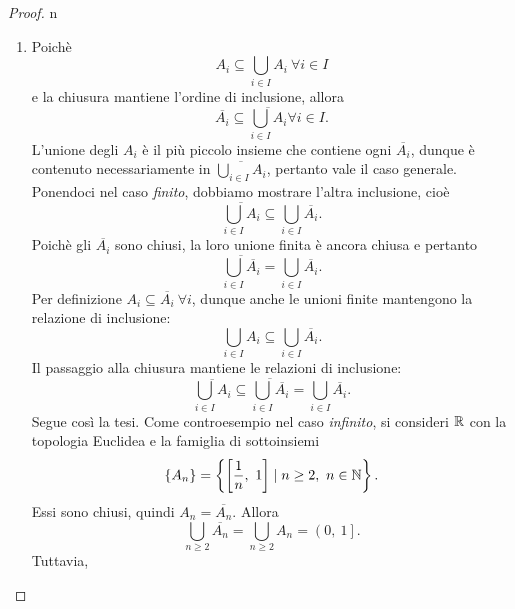 \begin{proof}{n}~{}
	\begin{enumerate}[label=\Roman*]
	\item Poichè
	\begin{equation*}
		A_i\subseteq \bigcup_{i\in I}A_i\ \forall i\in I
	\end{equation*}
	e la chiusura mantiene l'ordine di inclusione, allora
	\begin{equation*}
		\overline{A_i}\subseteq \overline{\bigcup_{i\in I}A_i}\forall i\in I.
	\end{equation*}
	L'unione degli $A_i$ è il più piccolo insieme che contiene ogni $\overline{A_i}$, dunque è contenuto necessariamente in $\displaystyle \overline{\bigcup_{i\in I}A_i}$, pertanto vale il caso generale. Ponendoci nel caso \textit{finito}, dobbiamo mostrare l'altra inclusione, cioè
	\begin{equation*}
		\overline{\bigcup_{i\in I}A_i}\subseteq\bigcup_{i\in I}\overline{A_i}.
	\end{equation*}
	Poichè gli $\overline{A_i}$ sono chiusi, la loro unione finita è ancora chiusa e pertanto
	\begin{equation*}
		\overline{\bigcup_{i\in I}\overline{A_i}}=\bigcup_{i\in I}\overline{A_i}.
	\end{equation*}
	Per definizione $A_i\subseteq\overline{A_i}\ \forall i$, dunque anche le unioni finite mantengono la relazione di inclusione:
	\begin{equation*}
		\bigcup_{i\in I}A_i\subseteq\bigcup_{i\in I}\overline{A_i}.
	\end{equation*}
	Il passaggio alla chiusura mantiene le relazioni di inclusione:
	\begin{equation*}
			\overline{\bigcup_{i\in I}A_i}\subseteq\overline{\bigcup_{i\in I}\overline{A_i}}=\bigcup_{i\in I}\overline{A_i}.
	\end{equation*}
	Segue così la tesi.	Come controesempio nel caso \textit{infinito}, si consideri $\mathbb{R}$ con la topologia Euclidea e la famiglia di sottoinsiemi
	\begin{equation*}
		\left\{A_n\right\}=\left\{\left[\frac{1}{n},\ 1\right]\mid n\geq 2,\ n\in \N\right\}.
	\end{equation*}
	Essi sono chiusi, quindi $A_n=\overline{A_n}$. Allora
	\begin{equation*}
		\bigcup_{n\geq 2}\overline{A_n}=\bigcup_{n\geq 2}A_n=\left(0,\ 1\right].
	\end{equation*}
Tuttavia,
\begin{equation*}

\end{equation*}
\end{enumerate}
\end{proof}
